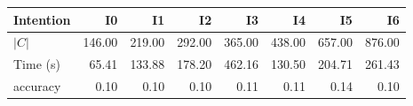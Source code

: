 \begin{tabular}{lrrrrrrr}
\toprule
Intention & I0 & I1 & I2 & I3 & I4 & I5 & I6 \\
\midrule
$|C|$ & 146.00 & 219.00 & 292.00 & 365.00 & 438.00 & 657.00 & 876.00 \\
Time (s) & 65.41 & 133.88 & 178.20 & 462.16 & 130.50 & 204.71 & 261.43 \\
accuracy & 0.10 & 0.10 & 0.10 & 0.11 & 0.11 & 0.14 & 0.10 \\
\bottomrule
\end{tabular}
